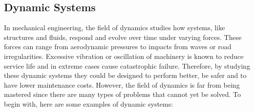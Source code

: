 \documentclass[12pt]{article}
\begin{document}
    \subsection{Dynamic Systems}
    In mechanical engineering, the field of dynamics studies how systems, like structures and fluids, respond and evolve over time under varying forces.
    These forces can range from aerodynamic pressures to impacts from waves or road irregularities.
    Excessive vibration or oscillation of machinery is known to reduce service life and in extreme cases cause catastrophic failure.
    Therefore, by studying these dynamic systems they could be designed to perform better, be safer and to have lower maintenance costs.
    However, the field of dynamics is far from being mastered since there are many types of problems that cannot yet be solved.
    To begin with, here are some examples of dynamic systems:
\end{document}
